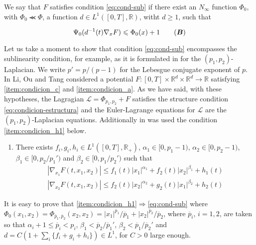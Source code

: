\documentclass[twoside]{article}
\makeatletter
\theoremstyle{remark}
\newcommand{\labitem}[2]{%
\def\@itemlabel{\textbf{#1}}
\item
\def\@currentlabel{#1}\label{#2}}
\renewcommand{\b}[1]{\boldsymbol{#1}}
\newcommand{\rr}{\mathbb{R}}
\renewcommand{\leq}{\leqslant}
\renewcommand{\geq}{\geqslant}
\newcounter{example}[section]
\makeatother
\begin{document}
We say that $F$ satisfies condition \eqref{eq:cond-sub} if there exist an $N_{\infty}$ function $\Phi_0$, with $\Phi_0 \llcurly \Phi$,
a function $d \in  L^1([0,T],\rr)$, witht $d\geq 1$, such that



\begin{equation}\label{eq:cond-sub}
  \Psi_0(d^{-1}(t)\nabla_x F)\leq \Phi_0(x)+1\tag{$\b{B}$}
\end{equation}

Let us take a moment to show that condition \eqref{eq:cond-sub} encompasses the sublinearity condition, for example, as it is formulated in \cite{li2014periodic} for the $(p_1,p_2)$-Laplacian. We write
$p'=p/(p-1)$ for the Lebesgue conjugate exponent of $p$. In \cite[Th. 1.1.]{li2014periodic} Li, Ou and Tang considered a potential $F:[0,T]\times\rr^d\times\rr^d\to\rr$ satisfying \ref{item:condicion_c} and \ref {item:condicion_a}.  As we have said, with these hypotheses, the Lagragian $\mathcal{L}=\Phi_{p_1,p_2}+F$ satisfies the structure condition \eqref{eq:condicion-estructura} and the Euler-Lagrange equations for $\mathcal{L}$ are the $(p_1,p_2)$-Laplacian equations. Additionally in \cite{li2014periodic} was used the condition \ref{item:condicion_h1} below. 
\begin{enumerate}   
  \labitem{(H1)}{item:condicion_h1} There exists $f_i,g_i,h_i\in L^1([0,T],\rr_+)$, $\alpha_1\in [0,p_1-1)$, $\alpha_2 \in [0,p_2-1)$, $\beta_1\in [0,p_2/p_1')$ and $\beta_2\in [0,p_1/p_2')$ such that
 \begin{equation*}
  \begin{split}
    |\nabla_{x_1}F(t,x_1,x_2)|\leq f_1(t)|x_1|^{\alpha_1}+f_2(t)|x_2|^{\beta_1}+h_1(t)\\
    |\nabla_{x_2}F(t,x_1,x_2)|\leq f_2(t)|x_2|^{\alpha_2}+g_2(t)|x_1|^{\beta_2}+h_2(t)
  \end{split}
 \end{equation*}

\end{enumerate}

It is easy to prove that \eqref{item:condicion_h1}$\Rightarrow$\eqref{eq:cond-sub} where
$\Phi_0(x_1,x_2)=\Phi_{\overline{p}_1,\overline{p}_2}(x_2,x_2)=|x_1|^{\overline{p}_1}/\overline{p}_1+|x_2|^{\overline{p}_2}/\overline{p}_2$, where $\overline{p}_i$, $i=1,2$, are taken so that  $\alpha_i+1\leq \overline{p}_i<p_i$, $\beta_1<\overline{p}_2/\overline{p}_1'$, $\beta_2<\overline{p}_1/\overline{p}_2'$ and $d=C(1+\sum_i \{f_i+g_i+h_i\})\in L^1$, for $C>0$ large enough. 
\end{document}
